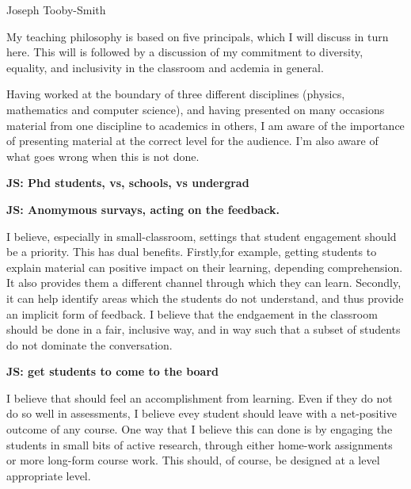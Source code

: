 \documentclass[14pt,letter]{article}
\newcommand{\js}[1]{{\leavevmode\color{magenta}\bf  JS: #1}}
\newcounter{customtitle}
\begin{document}
\vspace{-1cm}
\begin{flushright}
{{\Large \color{white}Joseph Tooby-Smith}}
\end{flushright}
\vspace{0.4cm}

My teaching philosophy is based on five principals, which I will discuss in turn here. This will is followed by a discussion of my commitment to diversity, equality, and inclusivity in the classroom and acdemia in general.
 
  Having worked at the boundary of 
three different disciplines (physics, mathematics and computer science), and having 
presented on many occasions material from one  discipline to academics in others, 
I am aware of the importance of presenting material at the correct level for the audience.
I'm also aware of what goes wrong when this is not done. 

\js{Phd students, vs, schools, vs undergrad}

  \js{Anomymous survays, acting on the feedback.}
  
  I believe, especially in small-classroom,
settings that student engagement should be a priority. This has dual benefits. 
Firstly,for example, getting students to explain material can positive impact
on their learning, depending comprehension. It also provides them a different channel through which 
they can learn. Secondly, it can help identify areas which the students 
do not understand, and thus provide an implicit form of feedback. 
I believe that the endgaement in the classroom should be done in a fair, 
inclusive way, and in way such that a subset of students do not dominate 
the conversation.

  \js{get students to come to the board}
  
  I believe that should 
feel an accomplishment from learning. Even if they do not do so well 
in assessments, I believe evey student should leave with a net-positive 
outcome of any course. One way that I believe this can done is by 
engaging the students in small bits of active research, through either 
home-work assignments or more long-form course work. This should, of course, 
be designed at a level appropriate level.
\end{document}
